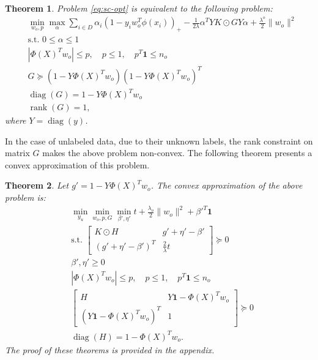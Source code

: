 \documentclass[12pt]{article}
\newtheorem{theorem}{Theorem}[section]
\DeclareMathOperator{\diag}{diag}
\DeclareMathOperator{\rank}{rank}
\begin{document}
	\begin{theorem}
		Problem \eqref{eq:sc-opt} is equivalent to the following problem:
		\begin{subequations}
			\label{eq:sc-dual-theorem}
			\begin{align}
				&\min_{w_o, p} \max_{\alpha} \sum_{i \in D} \alpha_i (1 - y_i w_o^T \phi(x_i))_+ - \frac{1}{2\lambda} \alpha^T Y K \odot G Y \alpha + \frac{\lambda^o}{2} \|w_o\|^2 \\
				&\text{s.t. } 0 \le \alpha \le 1 \\
				&|\Phi(X)^T w_o| \le p, \quad p \le 1, \quad p^T \mathbf{1} \le n_o \\
				&G \succeq (1 - Y \Phi(X)^T w_o)(1 - Y \Phi(X)^T w_o)^T \\
				&\diag(G) = 1 - Y \Phi(X)^T w_o \\
				&\rank(G) = 1,
			\end{align}
		\end{subequations}
		where $Y = \diag(y)$.
	\end{theorem}
	
	In the case of unlabeled data, due to their unknown labels, the rank constraint on matrix $G$ makes the above problem non-convex. The following theorem presents a convex approximation of this problem.
	
	\begin{theorem}
		Let $g' = 1 - Y \Phi(X)^T w_o$. The convex approximation of the above problem is:
		\begin{subequations}
			\label{eq:sc-convex-approx}
			\begin{align}
				&\min_{y_u} \min_{w_o, p, G} \min_{\beta', \eta'} t + \frac{\lambda_o}{2}\|w_o\|^2 + \beta'^T \mathbf{1} \\
				&\text{s.t. } 
				\begin{bmatrix}
					K \odot H & g' + \eta' - \beta' \\
					(g' + \eta' - \beta')^T & \frac{2}{\lambda} t
				\end{bmatrix} \succeq 0 \\
				&\beta', \eta' \ge 0 \\
				&|\Phi(X)^T w_o| \le p, \quad p \le 1, \quad p^T \mathbf{1} \le n_o \\
				&\begin{bmatrix}
					H & Y \mathbf{1} - \Phi(X)^T w_o \\
					(Y \mathbf{1} - \Phi(X)^T w_o)^T & 1
				\end{bmatrix} \succeq 0 \\
				&\diag(H) = 1 - \Phi(X)^T w_o.
			\end{align}
		\end{subequations}
		The proof of these theorems is provided in the appendix.
	\end{theorem}
	
\end{document}
